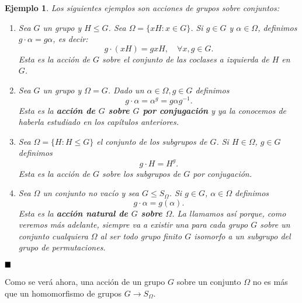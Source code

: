 \documentclass[12pt]{article}
\newtheorem{example}{Ejemplo}[theorem]
\begin{document}
\begin{example}\label{eq:ejcorazon}Los siguientes ejemplos son acciones de grupos sobre conjuntos:
\begin{enumerate}
\item Sea $G$ un grupo y $H \leq G$. Sea $\Omega = \lbrace xH : x \in G \rbrace$. Si $g \in G$ y $\alpha \in \Omega$, definimos $g \cdot \alpha = g\alpha$, es decir: $$g \cdot(xH) = gxH, \quad \forall x,g \in G.$$ Esta es la acción de $G$ sobre el conjunto de las coclases a izquierda de $H$ en $G$.
\item Sea $G$ un grupo y $\Omega = G$. Dado un $\alpha \in \Omega, g \in G$ definimos $$g \cdot \alpha= \alpha^g=g\alpha g^{-1}.$$ Esta es la \textbf{acción de $G$ sobre $G$ por conjugación} y ya la conocemos de haberla estudiado en los capítulos anteriores.
\item Sea $\Omega = \lbrace H : H \leq G \rbrace$ el conjunto de los subgrupos de $G$. Si $H \in \Omega$, $g \in G$ definimos $$ g \cdot H = H ^g.$$ Esta es la acción de $G$ sobre los subgrupos de $G$ por conjugación.
\item Sea $\Omega$ un conjunto no vacío y sea $G \leq S_{\Omega}$. Si $g \in G$, $\alpha \in \Omega$ definimos $$g \cdot \alpha = g(\alpha).$$ Esta es la \textbf{acción natural de $G$ sobre $\Omega$}. La llamamos así porque, como veremos más adelante, siempre va a existir una para cada grupo $G$ sobre un conjunto cualquiera $\Omega$ al ser todo grupo finito $G$ isomorfo a un subgrupo del grupo de permutaciones.
\end{enumerate}
\end{example}
$\hfill \blacksquare$

Como se verá ahora, una acción de un grupo $G$ sobre un conjunto $\Omega$ no es más que un homomorfismo de grupos $G \longrightarrow S_{\Omega}$.
\end{document}

